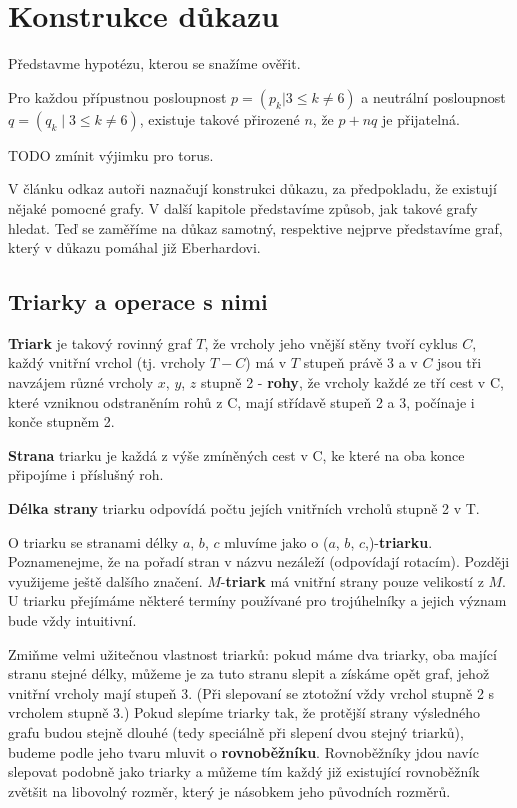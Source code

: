 
\chapter{Konstrukce důkazu}

Představme hypotézu, kterou se snažíme ověřit.
\begin{hypot}\label{veta02:1}
Pro každou přípustnou posloupnost $p=(p_k | 3 \leq k \neq 6)$ a neutrální posloupnost $q=(q_k \mid 3 \leq k \neq 6)$, existuje takové přirozené $n$, že $p+nq$ je přijatelná.
\end{hypot}

TODO zmínit výjimku pro torus.

V článku \citep{Samal09} odkaz autoři naznačují konstrukci důkazu, za předpokladu, že existují nějaké pomocné grafy. V další kapitole představíme způsob, jak takové grafy hledat. Teď se zaměříme na důkaz samotný, respektive nejprve představíme graf, který v důkazu pomáhal již Eberhardovi.

\section{Triarky a operace s nimi}

\begin{definice}[Triark]\label{def02:1}
\textbf{Triark} je takový rovinný graf $T$, že vrcholy jeho vnější stěny tvoří cyklus $C$, každý vnitřní vrchol (tj. vrcholy $T-C$) má v $T$ stupeň právě 3 a v $C$ jsou tři navzájem různé vrcholy $x$, $y$, $z$ stupně 2 - \textbf{rohy}, že vrcholy každé ze tří cest v C, které vzniknou odstraněním rohů z C, mají střídavě stupeň 2 a 3, počínaje i konče stupněm 2.
\end{definice}

\textbf{Strana} triarku je každá z výše zmíněných cest v C, ke které na oba konce připojíme i příslušný roh.

\textbf{Délka strany} triarku odpovídá počtu jejích vnitřních vrcholů stupně 2 v T.

O triarku se stranami délky $a$, $b$, $c$ mluvíme jako o ($a$, $b$, $c$,)-\textbf{triarku}. Poznamenejme, že na pořadí stran v názvu nezáleží (odpovídají rotacím).
Později využijeme ještě dalšího značení. $M$-\textbf{triark} má vnitřní strany pouze velikostí z $M$. U triarku přejímáme některé termíny používané pro trojúhelníky a jejich význam bude vždy intuitivní.

Zmiňme velmi užitečnou vlastnost triarků: pokud máme dva triarky, oba mající stranu stejné délky, můžeme je za tuto stranu slepit a získáme opět graf, jehož vnitřní vrcholy mají stupeň 3. (Při slepovaní se ztotožní vždy vrchol stupně 2 s vrcholem stupně 3.) Pokud slepíme triarky tak, že protější strany výsledného grafu budou stejně dlouhé (tedy speciálně při slepení dvou stejný triarků), budeme podle jeho tvaru mluvit o \textbf{rovnoběžníku}. Rovnoběžníky jdou navíc slepovat podobně jako triarky a můžeme tím každý již existující rovnoběžník zvětšit na libovolný rozměr, který je násobkem jeho původních rozměrů.


